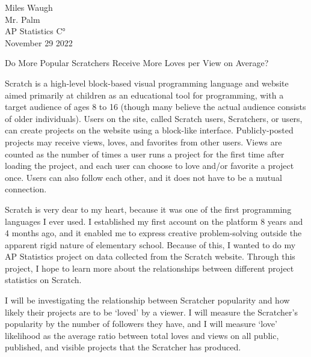 \documentclass[12pt]{article}
\begin{document}
\begin{flushleft}
	
	Miles Waugh\\
	Mr. Palm\\
	AP Statistics C°\\
	November 29 2022\\
	
	
	\begin{center}
		Do More Popular Scratchers Receive More Loves per View on Average?
	\end{center}
	
	
	\setlength{\parindent}{0.5in}
	

	Scratch is a high-level block-based visual programming language and website aimed primarily at children as an educational tool for programming, with a target audience of ages 8 to 16 (though many believe the actual audience consists of older individuals). Users on the site, called Scratch users, Scratchers, or users, can create projects on the website using a block-like interface. Publicly-posted projects may receive views, loves, and favorites from other users. Views are counted as the number of times a user runs a project for the first time after loading the project, and each user can choose to love and/or favorite a project once. Users can also follow each other, and it does not have to be a mutual connection.

	Scratch is very dear to my heart, because it was one of the first programming languages I ever used. I established my first account on the platform 8 years and 4 months ago, and it enabled me to express creative problem-solving outside the apparent rigid nature of elementary school. Because of this, I wanted to do my AP Statistics project on data collected from the Scratch website. Through this project, I hope to learn more about the relationships between different project statistics on Scratch.

	I will be investigating the relationship between Scratcher popularity and how likely their projects are to be ‘loved’ by a viewer. I will measure the Scratcher’s popularity by the number of followers they have, and I will measure ‘love’ likelihood as the average ratio between total loves and views on all public, published, and visible projects that the Scratcher has produced.
	

\end{flushleft}
\end{document}
